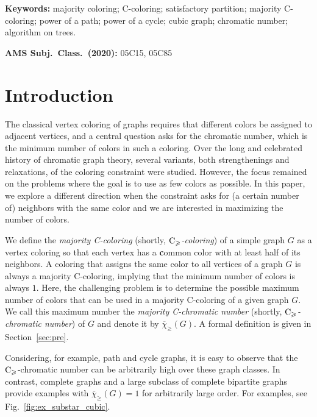 \documentclass{article}
\theoremstyle{definition}
\newcommand{\mc}{\overline{\chi}_{\geqslant}}
\newcommand{\cg}{{\rm C}_{\geqslant}}
\begin{document}
\noindent
{\bf Keywords:} majority coloring; C-coloring; satisfactory partition; majority C-coloring; power of a path; power of a  cycle; cubic graph; chromatic number; algorithm on trees.
\medskip

\noindent
{\bf AMS Subj.\ Class.\ (2020):}  05C15, 05C85

\section{Introduction}

The classical vertex coloring of graphs requires that different colors be assigned to adjacent vertices, and a central question asks for the chromatic number, which is the minimum number of colors in such a coloring. Over the long and celebrated history of chromatic graph theory, several variants, both strengthenings and relaxations, of the coloring constraint were studied. However, the focus remained on the problems where the goal is to use as few colors as possible. In this paper, we explore a different direction when the constraint asks for (a certain number of) neighbors with the same color and we are interested in maximizing the number of colors.  
\medskip

We define the \emph{majority C-coloring} (shortly, \emph{$\cg$-coloring})  of a simple graph $G$ as a vertex coloring so that each vertex has a \textbf{c}ommon color with at least half of its neighbors. A coloring that assigns the same color to all vertices of a graph $G$ is always a majority C-coloring, implying that the minimum number of colors is always $1$. Here, the challenging problem is to determine the possible maximum number of colors that can be used in a majority C-coloring of a given graph $G$. We call this maximum number the \emph{majority C-chromatic number} (shortly, \emph{$\cg$-chromatic number}) of $G$ and denote it by $\mc(G)$. A formal definition is given in Section~\ref{sec:pre}. 

Considering, for example,  path and cycle graphs, it is easy to observe that the $\cg$-chromatic number can be arbitrarily high over these graph classes. In contrast, complete graphs and a large subclass of complete bipartite graphs provide examples with $\mc(G)=1$ for arbitrarily large order.
For examples, see Fig.~\ref{fig:ex_substar_cubic}.
\end{document}
